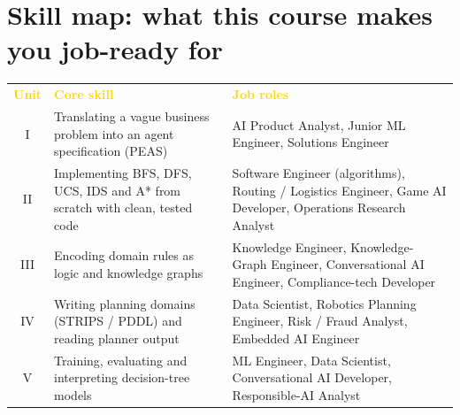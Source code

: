 \documentclass[11pt]{article}
\begin{document}
\section*{Skill map: what this course makes you job-ready for}
\begin{center}\small\begin{tabularx}{\linewidth}{c >{\raggedright}p{4cm} X}
\rowcolor{navy}\textcolor{gold}{\textbf{Unit}}&\textcolor{gold}{\textbf{Core skill}}&\textcolor{gold}{\textbf{Job roles}}\\
I&Translating a vague business problem into an agent specification (PEAS)&AI Product Analyst, Junior ML Engineer, Solutions Engineer\\
\rowcolor{ivory}II&Implementing BFS, DFS, UCS, IDS and A* from scratch with clean, tested code&Software Engineer (algorithms), Routing / Logistics Engineer, Game AI Developer, Operations Research Analyst\\
III&Encoding domain rules as logic and knowledge graphs&Knowledge Engineer, Knowledge-Graph Engineer, Conversational AI Engineer, Compliance-tech Developer\\
\rowcolor{ivory}IV&Writing planning domains (STRIPS / PDDL) and reading planner output&Data Scientist, Robotics Planning Engineer, Risk / Fraud Analyst, Embedded AI Engineer\\
V&Training, evaluating and interpreting decision-tree models&ML Engineer, Data Scientist, Conversational AI Developer, Responsible-AI Analyst\\
\end{tabularx}\end{center}
\end{document}
